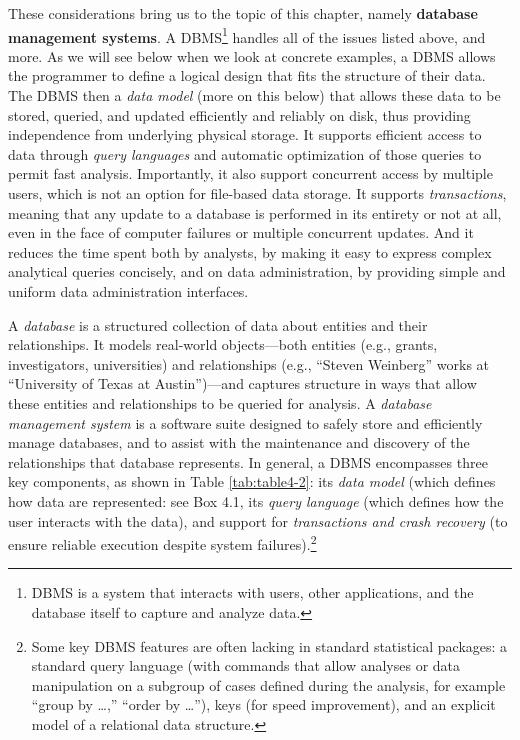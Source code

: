 \documentclass[]{krantz}
\begin{document}
These considerations bring us to the topic of this chapter, namely
\textbf{database management systems}. A DBMS\footnote{DBMS is a system
  that interacts with users, other applications, and the database itself
  to capture and analyze data.} handles all of the issues listed above,
and more. As we will see below when we look at concrete examples, a DBMS
allows the programmer to define a logical design that fits the structure
of their data. The DBMS then a \emph{data model} (more on this below)
that allows these data to be stored, queried, and updated efficiently
and reliably on disk, thus providing independence from underlying
physical storage. It supports efficient access to data through
\emph{query languages} and automatic optimization of those queries to
permit fast analysis. Importantly, it also support concurrent access by
multiple users, which is not an option for file-based data storage. It
supports \emph{transactions}, meaning that any update to a database is
performed in its entirety or not at all, even in the face of computer
failures or multiple concurrent updates. And it reduces the time spent
both by analysts, by making it easy to express complex analytical
queries concisely, and on data administration, by providing simple and
uniform data administration interfaces.

A \emph{database} is a structured collection of data about entities and
their relationships. It models real-world objects---both entities (e.g.,
grants, investigators, universities) and relationships (e.g., ``Steven
Weinberg'' works at ``University of Texas at Austin'')---and captures
structure in ways that allow these entities and relationships to be
queried for analysis. A \emph{database management system} is a software
suite designed to safely store and efficiently manage databases, and to
assist with the maintenance and discovery of the relationships that
database represents. In general, a DBMS encompasses three key
components, as shown in Table \ref{tab:table4-2}: its \emph{data model}
(which defines how data are represented: see Box 4.1, its \emph{query
language} (which defines how the user interacts with the data), and
support for \emph{transactions and crash recovery} (to ensure reliable
execution despite system failures).\footnote{Some key DBMS features are
  often lacking in standard statistical packages: a standard query
  language (with commands that allow analyses or data manipulation on a
  subgroup of cases defined during the analysis, for example ``group by
  \ldots{},'' ``order by \ldots{}''), keys (for speed improvement), and
  an explicit model of a relational data structure.}
\end{document}
